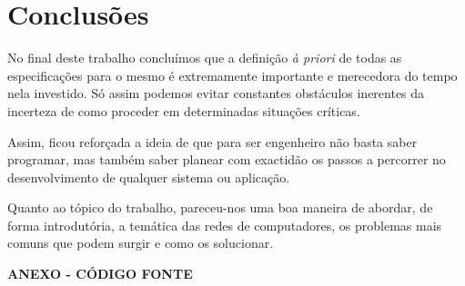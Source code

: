 \documentclass[a4paper,11pt]{article}
\begin{document}
\section{Conclusões}

No final deste trabalho concluímos que a definição \textit{à priori} de todas as especificações para o mesmo é extremamente importante e merecedora do tempo nela investido. Só assim podemos evitar constantes obstáculos inerentes da incerteza de como proceder em determinadas situações críticas.

Assim, ficou reforçada a ideia de que para ser engenheiro não basta saber programar, mas também saber planear com exactidão os passos a percorrer no desenvolvimento de qualquer sistema ou aplicação.

Quanto ao tópico do trabalho, pareceu-nos uma boa maneira de abordar, de forma introdutória, a temática das redes de computadores, os problemas mais comuns que podem surgir e como os solucionar.

\newpage

\vspace*{\fill} 
\centering
\begin{Huge}\textbf{ANEXO - CÓDIGO FONTE}\end{Huge}
\vspace*{\fill}
\thispagestyle{empty}
\setcounter{page}{1}
\end{document}
